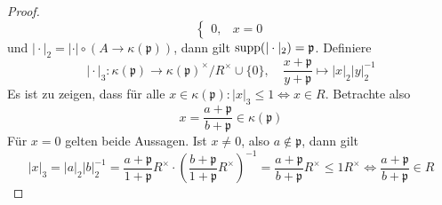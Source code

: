 \begin{proof}
\[\begin{cases}
        0, & x=0
    \end{cases}    
    \]
    und $\vert\cdot\vert_2 = \vert\cdot\vert \circ (A\to \kappa(\mathfrak{p}))$, dann gilt $\operatorname{supp}(\vert\cdot\vert_2) = \mathfrak{p}$. Definiere
    \[
    \vert \cdot\vert_3 : \kappa(\mathfrak{p}) \to \kappa(\mathfrak{p})^\times / R^\times \cup\{0\}, \quad  \frac{x+\mathfrak{p}}{y+\mathfrak{p}} \mapsto \vert x\vert_2 \vert y\vert_2^{-1}    
    \]
    Es ist zu zeigen, dass für alle $x\in \kappa(\mathfrak{p}): \vert x\vert_3 \le 1 \Leftrightarrow x\in R$. Betrachte also 
    \[
    x=\frac{a+\mathfrak{p}}{b+\mathfrak{p}} \in \kappa(\mathfrak{p})    
    \]
    Für $x=0$ gelten beide Aussagen. Ist $x\neq 0$, also $a\notin \mathfrak{p}$, dann gilt 
    \[
    \vert x\vert_3 = \vert a\vert_2 \vert b\vert_2^{-1} = \frac{a+\mathfrak{p}}{1+\mathfrak{p}}R^\times\cdot \left(\frac{b+\mathfrak{p}}{1+\mathfrak{p}}R^\times\right)^{-1} = \frac{a+\mathfrak{p}}{b+\mathfrak{p}}R^\times \le 1R^\times \Leftrightarrow \frac{a+\mathfrak{p}}{b+\mathfrak{p}} \in R    
    \]
\end{proof}